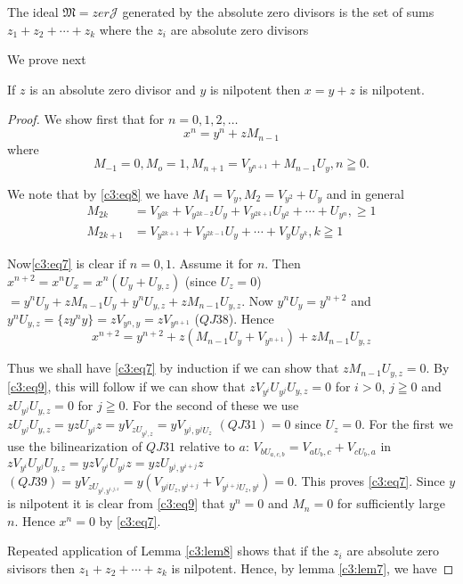 \begin{lemma}\label{c3:lem7}
The ideal $\mathfrak{M}=zer \mathscr{J}$ generated by the absolute
zero divisors is the set of sums $z_1+z_2+\cdots + z_k$ where the
$z_i$ are absolute zero divisors
\end{lemma}
We prove next
\begin{lemma}\label{c3:lem8}
If $z$ is an absolute zero divisor and $y$ is nilpotent then $x=y+z$
is nilpotent. 
\end{lemma}

\begin{proof}
We show first that for $n=0,1,2,\ldots$
\begin{equation*}
  x^{n}=y^{n}+zM_{n-1}\tag{7}\label{c3:eq7}
\end{equation*}
where
\begin{equation*}
  M_{-1}=0, M_o=1,M_{n+1}=V_{y^{n+1}}+M_{n-1}U_y, n\geqq 0.\tag{8}\label{c3:eq8}
\end{equation*}

We note that by \eqref{c3:eq8} we have $M_1=V_y,M_2=V_{y^{2}}+U_y$ and in
  general
\begin{align*}
  M_{2k}&=V_{y^{2k}}+V_{y^{2k-2}}U_y+V_{y^{2k+1}}U_{y^{2}}+\cdots +
  U_{y^{n}},\geq 1\tag{9}\label{c3:eq9}\\
M_{2k+1}&=V_{y^{2k+1}}+V_{y^{2k-1}}U_y+\cdots + V_yU_{y^{k}},k\geqq 1
\end{align*}

Now\pageoriginale \eqref{c3:eq7} is clear if $n=0,1$. Assume it for $n$. Then
$x^{n+2}=x^{n}U_x=x^{n}(U_y+U_{y,z})$ (since
$U_z=0$)$=y^{n}U_y+zM_{n-1}U_y+y^{n}U_{y,z}+zM_{n-1}U_{y,z}$. Now
$y^{n}U_y=y^{n+2}$ and $y^{n}
U_{y,z}=\{zy^{n}y\}=zV_{y^{n},y}=zV_{y^{n+1}}$ ($QJ 38$). Hence
$$
x^{n+2}=y^{n+2}+z(M_{n-1}U_y+V_{y^{n+1}})+zM_{n-1}U_{y,z}
$$

Thus we shall have \eqref{c3:eq7} by induction if we can show that
$zM_{n-1}U_{y,z}=0$. By \eqref{c3:eq9}, this will follow if we can show that
$zV_{y^{i}}U_{y^{j}}U_{y,z}=0$ for $i>0$, $j\geqq 0$ and $z
U_{y^{j}}U_{y,z}=0$ for $j\geqq 0$. For the second of these we use
$zU_{y^{j}}U_{y,z}=yzU_{y^{j}}z=yV_{zU_{y^{j},z}}=yV_{y^{j},y^{j}U_z}$
$(QJ 31)=0$ since $U_z=0$. For the first we use the bilinearization of
$QJ 31$ relative to $a$: $V_{bU_{a,c,b}}=V_{aU_{b},c}+V_{cU_b,a}$ in
  $zV_{y^{i}}U_{y^{j}}U_{y,z}=yzV_{y^{i}}U_{y^{j}}z=
  yzU_{y^{j},y^{i+j}}z$ $(QJ
  39)=yV_{zU_{y^{j},y^{i,j,z}}}=y(V_{y^{j}U_{z},y^{i+j}}+V_{y^{i+j}U_z,y^{i}})=0$.
This proves \eqref{c3:eq7}. Since $y$ is nilpotent it is clear from
\eqref{c3:eq9} that
$y^{n}=0$ and $M_n=0$ for sufficiently large $n$. Hence $x^{n}=0$ by
\eqref{c3:eq7}.

Repeated application of Lemma \ref{c3:lem8} shows that if the $z_i$ are absolute
zero sivisors then $z_1+z_2+\cdots+z_k$ is nilpotent. Hence, by lemma
\ref{c3:lem7}, we have
\end{proof}

